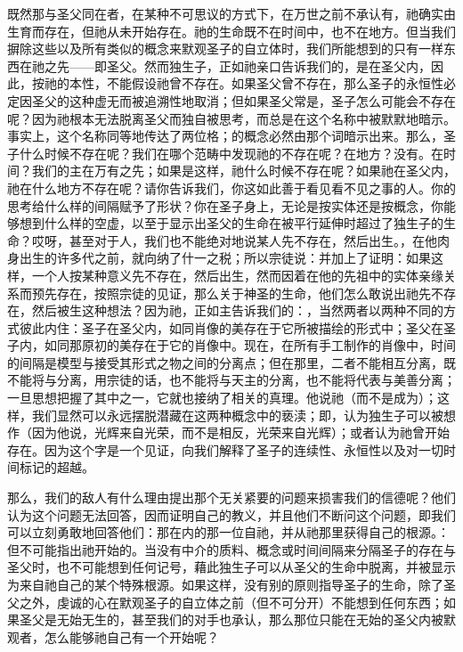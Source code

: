 既然那与圣父同在者，在某种不可思议的方式下，在万世之前不承认有，祂确实由生育而存在，但祂从未开始存在。祂的生命既不在时间中，也不在地方。但当我们摒除这些以及所有类似的概念来默观圣子的自立体时，我们所能想到的只有一样东西在祂之先——即圣父。然而独生子，正如祂亲口告诉我们的，是在圣父内，因此，按祂的本性，不能假设祂曾不存在。如果圣父曾不存在，那么圣子的永恒性必定因圣父的这种虚无而被追溯性地取消；但如果圣父常是，圣子怎么可能会不存在呢？因为祂根本无法脱离圣父而独自被思考，而总是在这个名称中被默默地暗示。事实上，这个名称同等地传达了两位格；的概念必然由那个词暗示出来。那么，圣子什么时候不存在呢？我们在哪个范畴中发现祂的不存在呢？在地方？没有。在时间？我们的主在万有之先；如果是这样，祂什么时候不存在呢？如果祂在圣父内，祂在什么地方不存在呢？请你告诉我们，你这如此善于看见看不见之事的人。你的思考给什么样的间隔赋予了形状？你在圣子身上，无论是按实体还是按概念，你能够想到什么样的空虚，以至于显示出圣父的生命在被平行延伸时超过了独生子的生命？哎呀，甚至对于人，我们也不能绝对地说某人先不存在，然后出生。，在他肉身出生的许多代之前，就向纳了什一之税；所以宗徒说：并加上了证明：如果这样，一个人按某种意义先不存在，然后出生，然而因着在他的先祖中的实体亲缘关系而预先存在，按照宗徒的见证，那么关于神圣的生命，他们怎么敢说出祂先不存在，然后被生这种想法？因为祂，正如主告诉我们的：，当然两者以两种不同的方式彼此内住：圣子在圣父内，如同肖像的美存在于它所被描绘的形式中；圣父在圣子内，如同那原初的美存在于它的肖像中。现在，在所有手工制作的肖像中，时间的间隔是模型与接受其形式之物之间的分离点；但在那里，二者不能相互分离，既不能将与分离，用宗徒的话，也不能将与天主的分离，也不能将代表与美善分离；一旦思想把握了其中之一，它就也接纳了相关的真理。他说祂（而不是成为）；这样，我们显然可以永远摆脱潜藏在这两种概念中的亵渎；即，认为独生子可以被想作（因为他说，光辉来自光荣，而不是相反，光荣来自光辉）；或者认为祂曾开始存在。因为这个字是一个见证，向我们解释了圣子的连续性、永恒性以及对一切时间标记的超越。\par

那么，我们的敌人有什么理由提出那个无关紧要的问题来损害我们的信德呢？他们认为这个问题无法回答，因而证明自己的教义，并且他们不断问这个问题，即我们可以立刻勇敢地回答他们：那在内的那一位自祂，并从祂那里获得自己的根源。：但不可能指出祂开始的。当没有中介的质料、概念或时间间隔来分隔圣子的存在与圣父时，也不可能想到任何记号，藉此独生子可以从圣父的生命中脱离，并被显示为来自祂自己的某个特殊根源。如果这样，没有别的原则指导圣子的生命，除了圣父之外，虔诚的心在默观圣子的自立体之前（但不可分开）不能想到任何东西；如果圣父是无始无生的，甚至我们的对手也承认，那么那位只能在无始的圣父内被默观者，怎么能够祂自己有一个开始呢？\par

